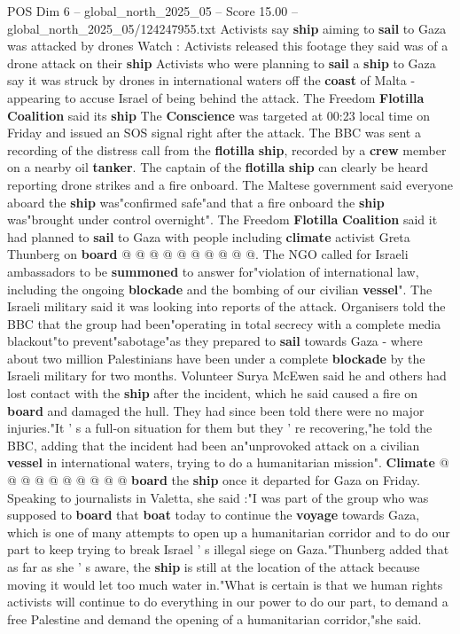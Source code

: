 \begin{textsample}{POS Dim 6 – global\_north\_2025\_05 – Score 15.00 – global\_north\_2025\_05/124247955.txt}  \label{ex:f6_pos_041}
Activists say \textbf{ship} aiming to \textbf{sail} to Gaza was attacked by drones Watch : Activists released this footage they said was of a drone attack on their \textbf{ship} Activists who were planning to \textbf{sail} a \textbf{ship} to Gaza say it was struck by drones in international waters off the \textbf{coast} of Malta - appearing to accuse Israel of being behind the attack.
The Freedom \textbf{Flotilla} \textbf{Coalition} said its \textbf{ship} The \textbf{Conscience} was targeted at 00:23 local time on Friday and issued an SOS signal right after the attack.
The BBC was sent a recording of the distress call from the \textbf{flotilla} \textbf{ship}, recorded by a \textbf{crew} member on a nearby oil \textbf{tanker}.
The captain of the \textbf{flotilla} \textbf{ship} can clearly be heard reporting drone strikes and a fire onboard.
The Maltese government said everyone aboard the \textbf{ship} was"confirmed safe"and that a fire onboard the \textbf{ship} was"brought under control overnight".
The Freedom \textbf{Flotilla} \textbf{Coalition} said it had planned to \textbf{sail} to Gaza with people including \textbf{climate} activist Greta Thunberg on \textbf{board} @ @ @ @ @ @ @ @ @ @.
The NGO called for Israeli ambassadors to be \textbf{summoned} to answer for"violation of international law, including the ongoing \textbf{blockade} and the bombing of our civilian \textbf{vessel}".
The Israeli military said it was looking into reports of the attack.
Organisers told the BBC that the group had been"operating in total secrecy with a complete media blackout"to prevent"sabotage"as they prepared to \textbf{sail} towards Gaza - where about two million Palestinians have been under a complete \textbf{blockade} by the Israeli military for two months.
Volunteer Surya McEwen said he and others had lost contact with the \textbf{ship} after the incident, which he said caused a fire on \textbf{board} and damaged the hull.
They had since been told there were no major injuries."It ' s a full-on situation for them but they ' re recovering,"he told the BBC, adding that the incident had been an"unprovoked attack on a civilian \textbf{vessel} in international waters, trying to do a humanitarian mission". \textbf{Climate} @ @ @ @ @ @ @ @ @ @ \textbf{board} the \textbf{ship} once it departed for Gaza on Friday.
Speaking to journalists in Valetta, she said :"I was part of the group who was supposed to \textbf{board} that \textbf{boat} today to continue the \textbf{voyage} towards Gaza, which is one of many attempts to open up a humanitarian corridor and to do our part to keep trying to break Israel ' s illegal siege on Gaza."Thunberg added that as far as she ' s aware, the \textbf{ship} is still at the location of the attack because moving it would let too much water in."What is certain is that we human rights activists will continue to do everything in our power to do our part, to demand a free Palestine and demand the opening of a humanitarian corridor,"she said.

\end{textsample}
